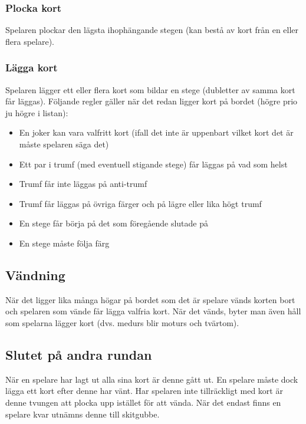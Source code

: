 \documentclass[a4paper,12pt]{article}
\begin{document}
\subsubsection{Plocka kort}
Spelaren plockar den lägsta ihophängande stegen (kan bestå av kort från en eller flera spelare).

\subsubsection{Lägga kort}
Spelaren lägger ett eller flera kort som bildar en stege (dubletter av samma kort får läggas). Följande regler gäller när det redan ligger kort på bordet (högre prio ju högre i listan):
\begin{itemize}
  \item En joker kan vara valfritt kort (ifall det inte är uppenbart vilket kort det är måste spelaren säga det)
  \item Ett par i trumf (med eventuell stigande stege) får läggas på vad som helst
  \item Trumf får inte läggas på anti-trumf
  \item Trumf får läggas på övriga färger och på lägre eller lika högt trumf
  \item En stege får börja på det som föregående slutade på
  \item En stege måste följa färg
\end{itemize}

\subsection{Vändning}
När det ligger lika många högar på bordet som det är spelare vänds korten bort och spelaren som vände får lägga valfria kort. När det vänds, byter man även håll som spelarna lägger kort (dvs. medurs blir moturs och tvärtom).

\subsection{Slutet på andra rundan}
När en spelare har lagt ut alla sina kort är denne gått ut. En spelare måste dock lägga ett kort efter denne har vänt. Har spelaren inte tillräckligt med kort är denne tvungen att plocka upp istället för att vända. När det endast finns en spelare kvar utnämns denne till skitgubbe.
\end{document}
